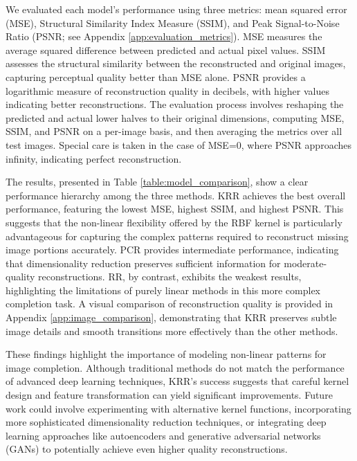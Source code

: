 \documentclass{article}
\begin{document}
We evaluated each model’s performance using three metrics: mean squared error (MSE), Structural Similarity Index Measure (SSIM), and Peak Signal-to-Noise Ratio (PSNR; see Appendix \ref{app:evaluation_metrics}). MSE measures the average squared difference between predicted and actual pixel values. SSIM assesses the structural similarity between the reconstructed and original images, capturing perceptual quality better than MSE alone. PSNR provides a logarithmic measure of reconstruction quality in decibels, with higher values indicating better reconstructions. The evaluation process involves reshaping the predicted and actual lower halves to their original dimensions, computing MSE, SSIM, and PSNR on a per-image basis, and then averaging the metrics over all test images. Special care is taken in the case of MSE=0, where PSNR approaches infinity, indicating perfect reconstruction.

The results, presented in Table \ref{table:model_comparison}, show a clear performance hierarchy among the three methods. KRR achieves the best overall performance, featuring the lowest MSE, highest SSIM, and highest PSNR. This suggests that the non-linear flexibility offered by the RBF kernel is particularly advantageous for capturing the complex patterns required to reconstruct missing image portions accurately. PCR provides intermediate performance, indicating that dimensionality reduction preserves sufficient information for moderate-quality reconstructions. RR, by contrast, exhibits the weakest results, highlighting the limitations of purely linear methods in this more complex completion task. A visual comparison of reconstruction quality is provided in Appendix \ref{app:image_comparison}, demonstrating that KRR preserves subtle image details and smooth transitions more effectively than the other methods.

These findings highlight the importance of modeling non-linear patterns for image completion. Although traditional methods do not match the performance of advanced deep learning techniques, KRR’s success suggests that careful kernel design and feature transformation can yield significant improvements. Future work could involve experimenting with alternative kernel functions, incorporating more sophisticated dimensionality reduction techniques, or integrating deep learning approaches like autoencoders and generative adversarial networks (GANs) to potentially achieve even higher quality reconstructions.
\end{document}
